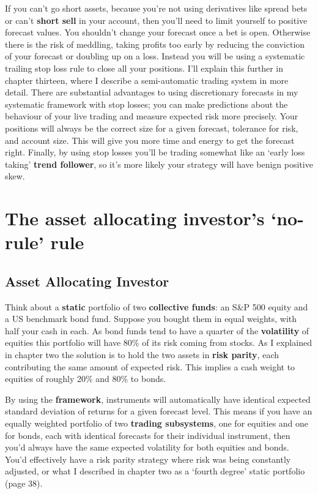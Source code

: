 If you can’t go short assets, because you’re not using derivatives like spread bets or can’t \textbf{short sell} in your account, then you’ll need to limit yourself to positive forecast values. You shouldn’t change your forecast once a bet is open. Otherwise there is the risk of meddling, taking profits too early by reducing the conviction of your forecast or doubling up on a loss. Instead you will be using a systematic trailing stop loss rule to close all your positions. I’ll explain this further in chapter thirteen, where I describe a semi-automatic trading system in more detail. There are substantial advantages to using discretionary forecasts in my systematic framework with stop losses; you can make predictions about the behaviour of your live trading and measure expected risk more precisely. Your positions will always be the correct size for a given forecast, tolerance for risk, and account size. This will give you more time and energy to get the forecast right. Finally, by using stop losses you’ll be trading somewhat like an ‘early loss taking’ \textbf{trend follower}, so it’s more likely your strategy will have benign positive skew.

\section*{The asset allocating investor’s ‘no-rule’ rule}  {}

\subsection*{Asset Allocating Investor}

Think about a \textbf{static} portfolio of two \textbf{collective funds}: an S\&P 500 equity and a US benchmark bond fund. Suppose you bought them in equal weights, with half your cash in each. As bond funds tend to have a quarter of the \textbf{volatility} of equities this portfolio will have 80\% of its risk coming from stocks. As I explained in chapter two the solution is to hold the two assets in \textbf{risk parity}, each contributing the same amount of expected risk. This implies a cash weight to equities of roughly 20\% and 80\% to bonds.

By using the \textbf{framework}, instruments will automatically have identical expected standard deviation of returns for a given forecast level. This means if you have an equally weighted portfolio of two \textbf{trading subsystems}, one for equities and one for bonds, each with identical forecasts for their individual instrument, then you'd always have the same expected volatility for both equities and bonds. You'd effectively have a risk parity strategy where risk was being constantly adjusted, or what I described in chapter two as a ‘fourth degree' static portfolio (page 38).

